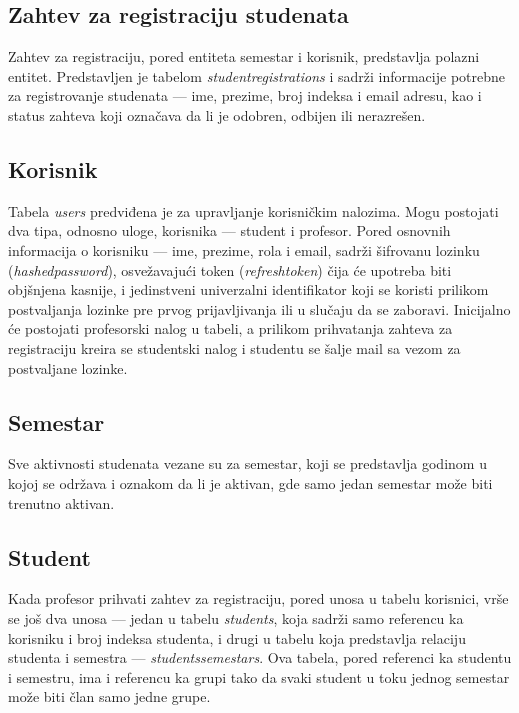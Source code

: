 \documentclass[12pt,oneside]{memoir}
\begin{document}
\subsection{Zahtev za registraciju studenata}
Zahtev za registraciju, pored entiteta semestar i korisnik, predstavlja polazni entitet. Predstavljen je tabelom \emph{student{\textunderscore}registrations} i sadrži
informacije potrebne za registrovanje studenata --- ime, prezime, broj indeksa i email adresu, kao i status zahteva koji označava da li je odobren, odbijen ili nerazrešen.

\subsection{Korisnik}
Tabela \emph{users} predviđena je za upravljanje korisničkim nalozima. Mogu postojati dva tipa, odnosno uloge, korisnika --- student i profesor. 
Pored osnovnih informacija o korisniku --- ime, prezime, rola i email, sadrži šifrovanu lozinku (\emph{hashed{\textunderscore}password}), osvežavajući
token (\emph{refresh{\textunderscore}token}) čija će upotreba biti objšnjena kasnije, i jedinstveni univerzalni identifikator koji se koristi prilikom postvaljanja lozinke
pre prvog prijavljivanja ili u slučaju da se zaboravi. Inicijalno će postojati profesorski nalog u tabeli, a prilikom prihvatanja zahteva za registraciju kreira se studentski nalog
i studentu se šalje mail sa vezom za postvaljane lozinke. 

\subsection{Semestar}
Sve aktivnosti studenata vezane su za semestar, koji se predstavlja godinom u kojoj se održava i oznakom da li je aktivan, gde samo jedan semestar može biti trenutno aktivan. 

\subsection{Student}
Kada profesor prihvati zahtev za registraciju, pored unosa u tabelu korisnici, vrše se još dva unosa --- jedan u tabelu \emph{students}, koja sadrži samo referencu ka korisniku i broj indeksa studenta, i 
drugi u tabelu koja predstavlja relaciju studenta i semestra --- \emph{students{\textunderscore}semestars}. Ova tabela, pored referenci ka studentu i semestru, ima i referencu ka grupi tako da 
svaki student u toku jednog semestar može biti član samo jedne grupe.
\end{document}
